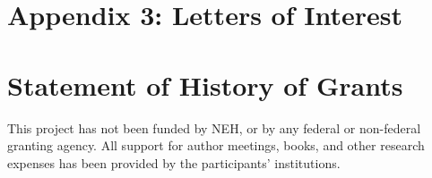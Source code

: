 \documentclass{article}[11pt]
\begin{document}




\section{Appendix 3: Letters of Interest}






\section{Statement of History of Grants}

This project has not been funded by NEH, or by any federal or non-federal granting agency.  All support for author meetings, books, and other research expenses has been provided by the participants’ institutions.


\clearpage
\end{document}
